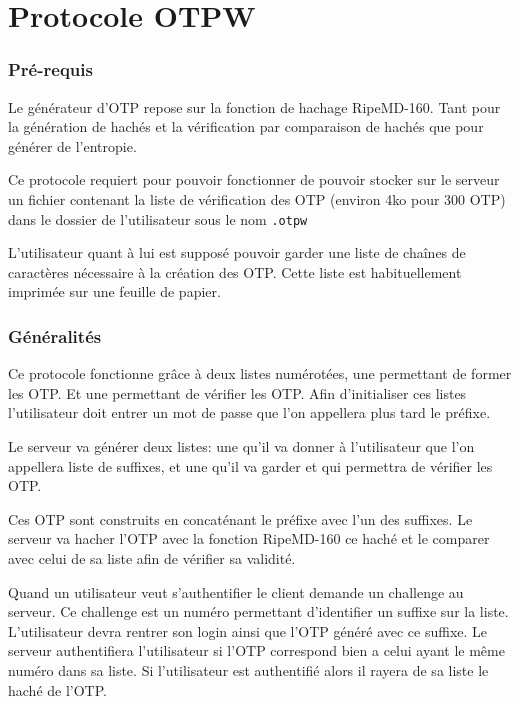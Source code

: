 \documentclass{../res/univ-projet}
\begin{document}
\part{Protocole OTPW}
\setcounter{section}{0}
\section{Pré-requis}
        Le générateur d'OTP repose sur la fonction de hachage RipeMD-160. Tant pour
    la génération de hachés et la vérification par comparaison de hachés
    que pour générer de l'entropie.

        Ce protocole requiert pour pouvoir fonctionner de pouvoir stocker
    sur le serveur un fichier contenant la liste de vérification des OTP (environ 
    4ko pour 300 OTP) dans le dossier de l'utilisateur sous le nom \verb?.otpw?
    
        L'utilisateur quant à lui est supposé pouvoir garder une liste de chaînes
    de caractères nécessaire à la création des OTP. Cette liste est habituellement
    imprimée sur une feuille de papier.

\section{Généralités}
        Ce protocole fonctionne grâce à deux listes numérotées, une permettant 
    de former les OTP. Et une permettant de vérifier les OTP. Afin d'initialiser
    ces listes l'utilisateur doit entrer un mot de passe que l'on appellera plus
    tard le préfixe. 
    
        Le serveur va générer deux listes: une qu'il va donner à l'utilisateur que
    l'on appellera liste de suffixes, et une qu'il va garder et qui permettra de
    vérifier les OTP.

        Ces OTP sont construits en concaténant le préfixe avec l'un des suffixes.
    Le serveur va hacher l'OTP avec la fonction RipeMD-160 ce haché et le comparer
    avec celui de sa liste afin de vérifier sa validité.

        Quand un utilisateur veut s'authentifier le client demande un challenge 
    au serveur. Ce challenge est un numéro permettant d'identifier un suffixe sur
    la liste. L'utilisateur devra rentrer son login ainsi que l'OTP généré avec
    ce suffixe. Le serveur authentifiera l'utilisateur si l'OTP correspond bien 
    a celui ayant le même numéro dans sa liste. Si l'utilisateur est authentifié
    alors il rayera de sa liste le haché de l'OTP.
\end{document}
